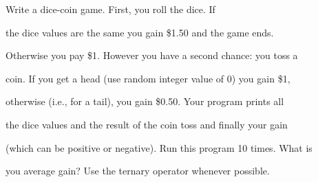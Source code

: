 Write a dice-coin game. First, you roll the dice. If

the dice values are the same you gain \$1.50 and the game ends.

Otherwise you pay \$1. However you have a second chance: you toss a

coin. If you get a head (use random integer value of 0) you gain \$1,

otherwise (i.e., for a tail), you gain \$0.50. Your program prints all

the dice values and the result of the coin toss and finally your gain

(which can be positive or negative). Run this program 10 times. What is

you average gain? Use the ternary operator whenever possible.

